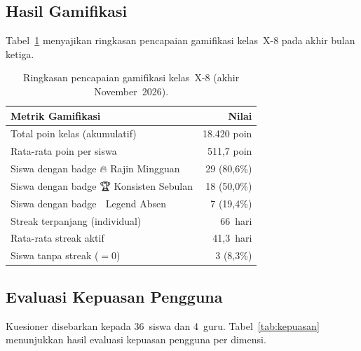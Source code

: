 \documentclass[12pt,a4paper]{article}
\begin{document}
\subsection{Hasil Gamifikasi}

Tabel~\ref{tab:gamifikasi} menyajikan ringkasan pencapaian gamifikasi
kelas~X-8 pada akhir bulan ketiga.

\begin{table}[htbp]
\centering
\caption{Ringkasan pencapaian gamifikasi kelas~X-8
         (akhir November~2026).}
\label{tab:gamifikasi}
\small
\renewcommand{\arraystretch}{1.15}
\begin{tabular}{lr}
\toprule
\textbf{Metrik Gamifikasi} & \textbf{Nilai} \\
\midrule
Total poin kelas (akumulatif)      & 18.420 poin \\
Rata-rata poin per siswa           & 511,7 poin \\
Siswa dengan badge 🔥 Rajin Mingguan & 29 (80,6\%) \\
Siswa dengan badge 🏆 Konsisten Sebulan & 18 (50,0\%) \\
Siswa dengan badge 👑 Legend Absen & 7 (19,4\%) \\
Streak terpanjang (individual)     & 66~hari \\
Rata-rata streak aktif             & 41,3~hari \\
Siswa tanpa streak ($= 0$)         & 3 (8,3\%) \\
\bottomrule
\end{tabular}
\end{table}

\subsection{Evaluasi Kepuasan Pengguna}

Kuesioner disebarkan kepada 36~siswa dan 4~guru.
Tabel~\ref{tab:kepuasan} menunjukkan hasil evaluasi kepuasan
pengguna per dimensi.
\end{document}
